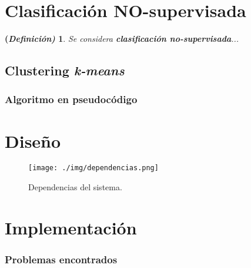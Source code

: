 \documentclass[10pt,a4paper]{article}
\newtheorem{defi}{(\it Definición)}[section]%
\begin{document}
\section{Clasificación \textbf{NO-supervisada}}

\begin{defi}
	Se considera \textbf{clasificación no-supervisada}...
\end{defi}

\subsection{Clustering \textit{\textbf{k-means}}}

\subsubsection{Algoritmo en pseudocódigo}

\section{Diseño}
 
\begin{figure}[H]
	\centering
	\texttt{[image: ./img/dependencias.png]}%
	\caption[Esquema de dependencias del sistema]{Dependencias del sistema\protect\footnotemark.}
	\label{fig:dependencias}
\end{figure}




\section{Implementación}

\subsubsection{Problemas encontrados} 
\end{document}
